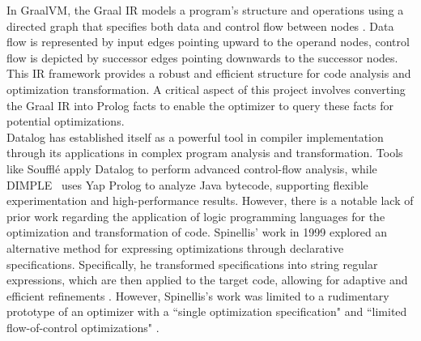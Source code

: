 In GraalVM, the Graal IR models a program's structure and operations using a directed graph that specifies both data and control flow between nodes \cite{Graal2021}. Data flow is represented by input edges pointing upward to the operand nodes, control flow is depicted by successor edges pointing downwards to the successor nodes. This IR framework provides a robust and efficient structure for code analysis and optimization transformation. 
A critical aspect of this project involves converting the Graal IR into Prolog facts to enable the optimizer to query these facts for potential optimizations. \\

Datalog has established itself as a powerful tool in compiler implementation through its applications in complex program analysis and transformation. 
Tools like Soufflé \cite{silverman2021wantanalyzeschemeprograms} apply Datalog to perform advanced control-flow analysis, while DIMPLE~\cite{Benton2007} uses Yap Prolog to analyze Java bytecode, supporting flexible experimentation and high-performance results.
However, there is a notable lack of prior work regarding the application of logic programming languages for the optimization and transformation of code. 
Spinellis’ work in 1999 explored an alternative method for expressing optimizations through declarative specifications. Specifically, he transformed specifications into string regular expressions, which are then applied to the target code, allowing for adaptive and efficient refinements \cite{Spinellis1999}. However, Spinellis’s work was limited to a rudimentary prototype of an optimizer with a ``single optimization specification" and ``limited flow-of-control optimizations" \cite{Spinellis1999}.
